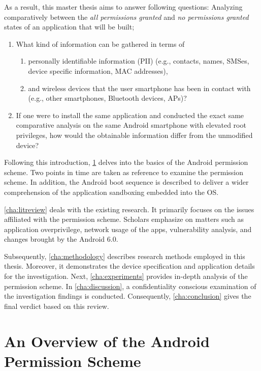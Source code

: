 \documentclass[
  a4paper,  %
  twoside,  %
  bibliography=totoc,
  headsepline,
  cleardoublepage=empty,
  parskip=half,
  draft=false,
  open=any
]{scrbook}
\begin{document}
As a result, this master thesis aims to answer following questions: Analyzing comparatively between the \textit{all permissions granted} and \textit{no permissions granted} states of an application that will be built;
\begin{enumerate}
	\item What kind of information can be gathered in terms of 
	\begin{enumerate}
		\item personally identifiable information (PII) (e.g., contacts, names, SMSes, device specific information, MAC addresses),
		\item and wireless devices that the user smartphone has been in contact with (e.g., other smartphones, Bluetooth devices, APs)? 
	\end{enumerate}
	\item If one were to install the same application and conducted the exact same comparative analysis on the same Android smartphone with elevated root privileges, how would the obtainable information differ from the unmodified device?
\end{enumerate}

Following this introduction, \cref{cha:permissions} delves into the basics of the Android permission scheme. Two points in time are taken as reference to examine the permission scheme. In addition, the Android boot sequence is described to deliver a wider comprehension of the application sandboxing embedded into the OS.

\cref{cha:litreview} deals with the existing research. It primarily focuses on the issues affiliated with the permission scheme. Scholars emphasize on matters such as application overprivilege, network usage of the apps, vulnerability analysis, and changes brought by the Android 6.0.

Subsequently, \cref{cha:methodology} describes research methods employed in this thesis. Moreover, it demonstrates the device specification and application details for the investigation. Next, \cref{cha:experiments} provides in-depth analysis of the permission scheme. In \cref{cha:discussion}, a confidentiality conscious examination of the investigation findings is conducted. Consequently, \cref{cha:conclusion} gives the final verdict based on this review.

\chapter{An Overview of the Android Permission Scheme}
\label{cha:permissions}
\end{document}
